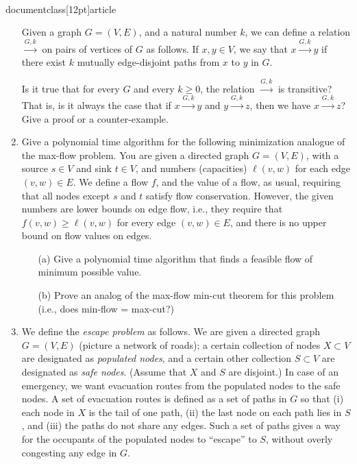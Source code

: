 \\documentclass[12pt]{article}
\begin{document}
\begin{enumerate}
\def\lnk{{\stackrel{G,k}{\longrightarrow}}}

Given a graph $G = (V,E)$, and a natural number $k$,
we can define a relation $\lnk$ on pairs of vertices of $G$ as follows.
If $x, y \in V$, we say that $x \lnk y$ if there
exist $k$ mutually edge-disjoint paths from $x$ to $y$ in $G$.

Is it true that for every $G$ and every $k \geq 0$,
the relation $\lnk$ is transitive?
That is, is it always the case that if $x \lnk y$ and $y \lnk z$,
then we have $x \lnk z$?
Give a proof or a counter-example.



\item 

Give a polynomial time algorithm for the following minimization analogue
of the max-flow problem. 
You are given a directed graph $G=(V,E)$, with a source $s \in V$ 
and sink $t \in V$, and numbers (capacities) $\ell(v,w)$ for each edge 
$(v,w) \in E$. 
We define a flow $f$, and the value of a flow, as usual, requiring 
that all nodes except $s$ and $t$ satisfy flow conservation. 
However, the given numbers are lower bounds on edge flow, 
i.e., they require that $f(v,w) \ge \ell(v,w)$ for every edge $(v,w) \in E$, 
and there is no upper bound on flow values on edges.
\begin{itemize}
\item[(a)] Give a polynomial time algorithm that finds 
a feasible flow of minimum possible value.
\item[(b)] Prove an analog of the max-flow min-cut theorem for this problem 
(i.e., does min-flow = max-cut?)
\end{itemize}






\item 

We define the {\em escape problem} as
follows.  We are given a directed graph $G = (V,E)$ (picture a
network of roads); a certain collection of nodes $X \subset V$
are designated as {\em populated nodes}, and a certain
other collection $S \subset V$ are designated as {\em safe nodes}.
(Assume that $X$ and $S$ are disjoint.)
In case of an emergency, we want evacuation routes
from the populated nodes to the safe nodes.
A set of evacuation routes is defined as a set
of paths in $G$ so that (i) each node in $X$ is the
tail of one path, (ii) the last node on each path lies in $S$, and
(iii) the paths do not share any edges.
Such a set of paths gives a way for the
occupants of the populated nodes to ``escape'' to $S$,
without overly congesting any edge in $G$.


\end{enumerate}
\end{document}
